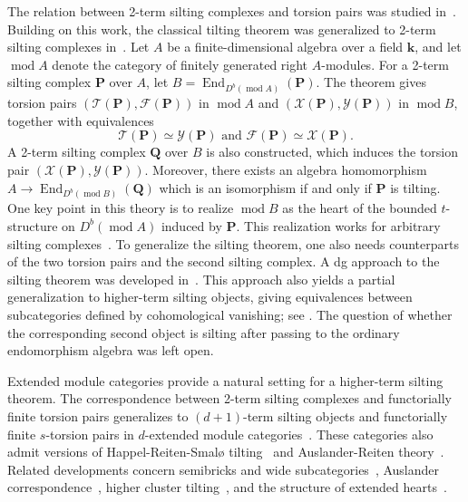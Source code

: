 \documentclass[11pt,a4paper,reqno]{amsart}
\theoremstyle{plain}
\numberwithin{equation}{section}
\theoremstyle{definition}
\renewcommand{\mod}{\operatorname{mod}}
\newcommand{\End}{\operatorname{End}}
\renewcommand{\k}{\mathbf{k}}
\newcommand{\PP}{\mathbf{P}}
\newcommand{\QQ}{\mathbf{Q}}
\newcommand{\T}{\mathcal{T}}
\newcommand{\F}{\mathcal{F}}
\newcommand{\X}{\mathcal{X}}
\newcommand{\Y}{\mathcal{Y}}
\begin{document}
The relation between 2-term silting complexes and torsion pairs was studied in~\cite{HKM,AIR}. Building on this work, the classical tilting theorem was generalized to 2-term silting complexes in~\cite{BZ}. Let $A$ be a finite-dimensional algebra over a field $\k$, and let $\mod A$ denote the category of finitely generated right $A$-modules. For a 2-term silting complex $\PP$ over $A$, let $B=\End_{D^b(\mod A)}(\PP)$. The theorem gives torsion pairs $(\T(\PP),\F(\PP))$ in $\mod A$ and $(\X(\PP),\Y(\PP))$ in $\mod B$, together with equivalences
\[\T(\PP)\simeq\Y(\PP)\text{ and }\F(\PP)\simeq\X(\PP).\]
A 2-term silting complex $\QQ$ over $B$ is also constructed, which induces the torsion pair $(\X(\PP),\Y(\PP))$. Moreover, there exists an algebra homomorphism $A\to\End_{D^b(\mod B)}(\QQ)$ which is an isomorphism if and only if $\PP$ is tilting. One key point in this theory is to realize $\mod B$ as the heart of the bounded $t$-structure on $D^b(\mod A)$ induced by $\PP$. This realization works for arbitrary silting complexes~\cite{KY}. To generalize the silting theorem, one also needs counterparts of the two torsion pairs and the second silting complex. A dg approach to the silting theorem was developed in~\cite{XYZ}. This approach also yields a partial generalization to higher-term silting objects, giving equivalences between subcategories defined by cohomological vanishing; see \cite[Section~4.5]{XYZ}. The question of whether the corresponding second object is silting after passing to the ordinary endomorphism algebra was left open.

Extended module categories provide a natural setting for a higher-term silting theorem. The correspondence between 2-term silting complexes and functorially finite torsion pairs generalizes to $(d+1)$-term silting objects and functorially finite $s$-torsion pairs in $d$-extended module categories~\cite{G,Z,WZ,HZ}. These categories also admit versions of Happel-Reiten-Smal\o{} tilting~\cite{AET,Z} and Auslander-Reiten theory~\cite{Z,MP,Ru}. Related developments concern semibricks and wide subcategories~\cite{GZ}, Auslander correspondence~\cite{M2}, higher cluster tilting~\cite{M3}, and the structure of extended hearts~\cite{M1,P,MNO}.
\end{document}
